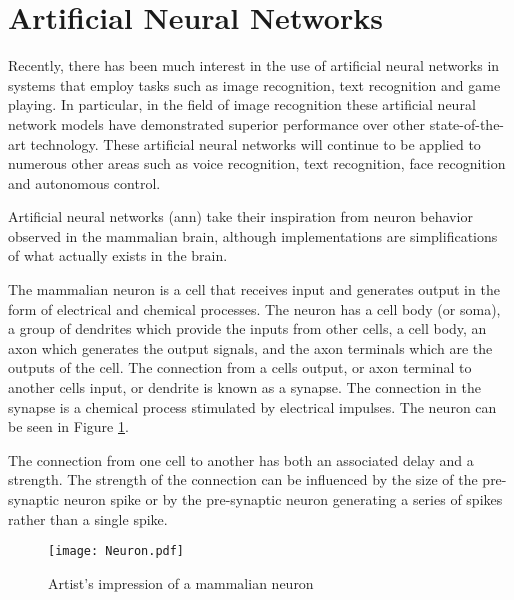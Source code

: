 
\section{Artificial Neural Networks}
\label{sec:Artificial Neural Networks}
\label{sec:chap-two}

Recently, there has been much interest in the use of artificial neural networks in systems that employ tasks such as image recognition\cite{krizhevsky2012imagenet}, text recognition\cite{qiu2013parallel} and game playing\cite{maddison2014move}.
In particular, in the field of image recognition these artificial neural network models have demonstrated superior performance
over other state-of-the-art technology\cite{krizhevsky2012imagenet}.
These artificial neural networks will continue to be applied to numerous other areas such as voice recognition, text recognition, 
face recognition and autonomous control.

Artificial neural networks (\ac{ann}) take their inspiration from neuron behavior observed in the mammalian brain, although implementations are simplifications of what actually exists in the brain.

The mammalian neuron is a cell that receives input and generates output in the form of electrical and chemical processes.
The neuron has a cell body (or soma), a group of dendrites which provide the inputs from other cells, a cell body, an axon which generates the output signals, and the axon terminals which are the outputs of the cell.
The connection from a cells output, or axon terminal to another cells input, or dendrite is known as a synapse. 
The connection in the synapse is a chemical process stimulated by electrical impulses.
The neuron can be seen in Figure \ref{fig:neuron}.

The connection from one cell to another has both an associated delay and a strength. The strength of the connection can be influenced by the size of the pre-synaptic neuron spike or by the pre-synaptic neuron generating a series of spikes rather than a single spike.

\begin{figure}[!t]
\centering
\captionsetup{justification=centering}
\captionsetup{width=.9\linewidth}
\centerline{
\mbox{\texttt{[image: Neuron.pdf]}}
}
\caption{Artist's impression of a mammalian neuron \cite{wikipedia_neuron}}
\label{fig:neuron}
\end{figure}



